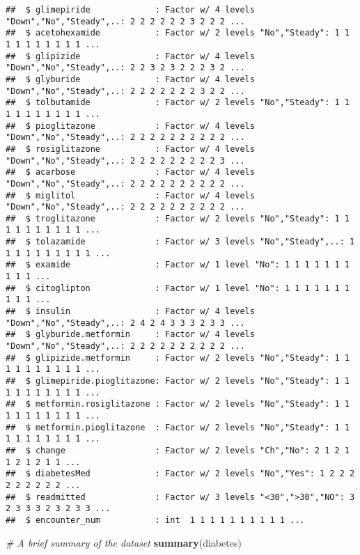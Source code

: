 \documentclass[
]{article}
\newenvironment{Shaded}{\begin{snugshade}}{\end{snugshade}}
\newcommand{\CommentTok}[1]{\textcolor[rgb]{0.56,0.35,0.01}{\textit{#1}}}
\newcommand{\KeywordTok}[1]{\textcolor[rgb]{0.13,0.29,0.53}{\textbf{#1}}}
\newcommand{\NormalTok}[1]{#1}
\begin{document}
\begin{verbatim}
##  $ glimepiride             : Factor w/ 4 levels "Down","No","Steady",..: 2 2 2 2 2 2 3 2 2 2 ...
##  $ acetohexamide           : Factor w/ 2 levels "No","Steady": 1 1 1 1 1 1 1 1 1 1 ...
##  $ glipizide               : Factor w/ 4 levels "Down","No","Steady",..: 2 2 3 2 3 2 2 2 3 2 ...
##  $ glyburide               : Factor w/ 4 levels "Down","No","Steady",..: 2 2 2 2 2 2 2 3 2 2 ...
##  $ tolbutamide             : Factor w/ 2 levels "No","Steady": 1 1 1 1 1 1 1 1 1 1 ...
##  $ pioglitazone            : Factor w/ 4 levels "Down","No","Steady",..: 2 2 2 2 2 2 2 2 2 2 ...
##  $ rosiglitazone           : Factor w/ 4 levels "Down","No","Steady",..: 2 2 2 2 2 2 2 2 2 3 ...
##  $ acarbose                : Factor w/ 4 levels "Down","No","Steady",..: 2 2 2 2 2 2 2 2 2 2 ...
##  $ miglitol                : Factor w/ 4 levels "Down","No","Steady",..: 2 2 2 2 2 2 2 2 2 2 ...
##  $ troglitazone            : Factor w/ 2 levels "No","Steady": 1 1 1 1 1 1 1 1 1 1 ...
##  $ tolazamide              : Factor w/ 3 levels "No","Steady",..: 1 1 1 1 1 1 1 1 1 1 ...
##  $ examide                 : Factor w/ 1 level "No": 1 1 1 1 1 1 1 1 1 1 ...
##  $ citoglipton             : Factor w/ 1 level "No": 1 1 1 1 1 1 1 1 1 1 ...
##  $ insulin                 : Factor w/ 4 levels "Down","No","Steady",..: 2 4 2 4 3 3 3 2 3 3 ...
##  $ glyburide.metformin     : Factor w/ 4 levels "Down","No","Steady",..: 2 2 2 2 2 2 2 2 2 2 ...
##  $ glipizide.metformin     : Factor w/ 2 levels "No","Steady": 1 1 1 1 1 1 1 1 1 1 ...
##  $ glimepiride.pioglitazone: Factor w/ 2 levels "No","Steady": 1 1 1 1 1 1 1 1 1 1 ...
##  $ metformin.rosiglitazone : Factor w/ 2 levels "No","Steady": 1 1 1 1 1 1 1 1 1 1 ...
##  $ metformin.pioglitazone  : Factor w/ 2 levels "No","Steady": 1 1 1 1 1 1 1 1 1 1 ...
##  $ change                  : Factor w/ 2 levels "Ch","No": 2 1 2 1 1 2 1 2 1 1 ...
##  $ diabetesMed             : Factor w/ 2 levels "No","Yes": 1 2 2 2 2 2 2 2 2 2 ...
##  $ readmitted              : Factor w/ 3 levels "<30",">30","NO": 3 2 3 3 3 2 3 2 3 3 ...
##  $ encounter_num           : int  1 1 1 1 1 1 1 1 1 1 ...
\end{verbatim}

\begin{Shaded}
\begin{Highlighting}[]
\CommentTok{# A brief summary of the dataset}
\KeywordTok{summary}\NormalTok{(diabetes)}
\end{Highlighting}
\end{Shaded}
\end{document}
